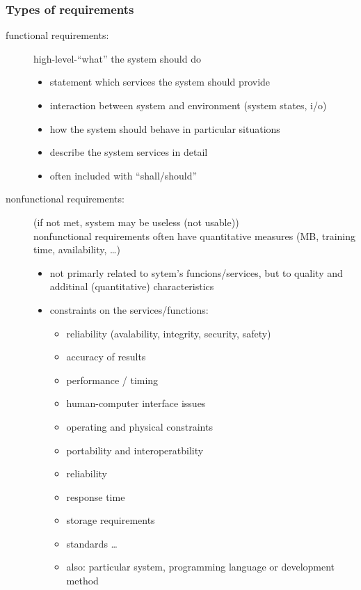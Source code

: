 \documentclass[a4paper, 10pt]{article}
\begin{document}
\subsubsection{Types of requirements}
\begin{description}
	\item[functional requirements:] high-level-``what'' the system should do
		\begin{itemize}
			\item statement which services the system should provide
			\item interaction between system and environment (system states, i/o)
			\item how the system should behave in particular situations
			\item describe the system services in detail
			\item often included with ``shall/should''
		\end{itemize}
	\item[nonfunctional requirements:] (if not met, system may be useless (not usable)) \\
	nonfunctional requirements often have quantitative measures (MB, training time, availability, \dots)\\
	
		\begin{itemize}
			\item not primarly related to sytem's funcions/services, but to quality and additinal (quantitative) characteristics
			\item constraints on the services/functions:
			\begin{itemize}
				\item reliability (avalability, integrity, security, safety)
				\item accuracy of results
				\item performance / timing
				\item human-computer interface issues
				\item operating and physical constraints
				\item portability and interoperatbility
				\item reliability
				\item response time
				\item storage requirements
				\item standards \dots
				\item also: particular system, programming language or development method
			\end{itemize}

\end{itemize}
\end{description}
\end{document}
